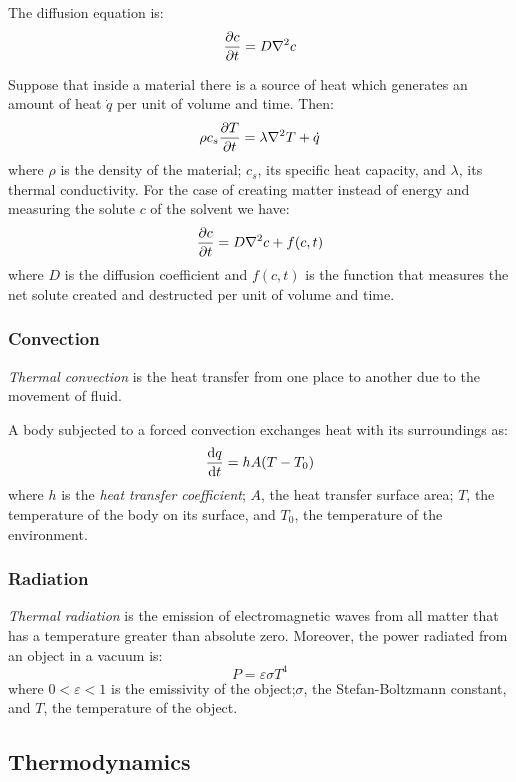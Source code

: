\documentclass[../../../main.tex]{subfiles}
\begin{document}
\begin{multicols}{2}
\begin{prop}
        The diffusion equation is: $$\pdv{c}{t}=D\laplacian c$$
    \end{prop}
    \begin{prop}
        Suppose that inside a material there is a source of heat which generates an amount of heat $\dot{q}$ per unit of volume and time. Then:
        $$\rho c_s\pdv{T}{t}=\lambda\laplacian T+\dot{q}$$
        where $\rho$ is the density of the material; $c_s$, its specific heat capacity, and $\lambda$, its thermal conductivity.
        For the case of creating matter instead of energy and measuring the solute $c$ of the solvent we have:
        $$\pdv{c}{t}=D\laplacian c+f(c,t)$$
        where $D$ is the diffusion coefficient and $f(c,t)$ is the function that measures the net solute created and destructed per unit of volume and time.
    \end{prop}
    \subsubsection*{Convection}
    \begin{definition}[Convection]
        \textit{Thermal convection} is the heat transfer from one place to another due to the movement of fluid.
    \end{definition}
    \begin{prop}
        A body subjected to a forced convection exchanges heat with its surroundings as: $$\dv{q}{t}=hA(T-T_0)$$ where $h$ is the \textit{heat transfer coefficient}; $A$, the heat transfer surface area; $T$, the temperature of the body on its surface, and $T_0$, the temperature of the environment.
    \end{prop}
    \subsubsection*{Radiation}
    \begin{definition}[Radiation]
        \textit{Thermal radiation} is the emission of electromagnetic waves from all matter that has a temperature greater than absolute zero. Moreover, the power radiated from an object in a vacuum is: $$P=\varepsilon\sigma T^4$$ where $0<\varepsilon<1$ is the emissivity of the object;$\sigma$, the Stefan-Boltzmann constant, and $T$, the temperature of the object.
    \end{definition}
    \subsection{Thermodynamics}

\end{multicols}
\end{document}
